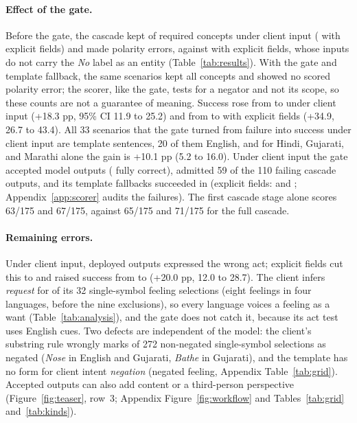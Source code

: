 


\paragraph{Effect of the gate.}
Before the gate, the cascade kept \XPreUKeptPct{} of required concepts under client input (\XPreSKeptPct{} with explicit fields) and made \XPreUPol{} polarity errors, against \XPreSPol{} with explicit fields, whose inputs do not carry the \emph{No} label as an entity (Table~\ref{tab:results}).
With the gate and template fallback, the same scenarios kept all \NConc{} concepts and showed no scored polarity error; the scorer, like the gate, tests for a negator and not its scope, so these counts are not a guarantee of meaning.
Success rose from \XPreUSucc{} to \XDepUSucc{} under client input (+18.3 pp, 95\% CI 11.9 to 25.2) and from \XPreSSucc{} to \XDepSSucc{} with explicit fields (+34.9, 26.7 to 43.4).
All 33 scenarios that the gate turned from failure into success under client input are template sentences, 20 of them English, and for Hindi, Gujarati, and Marathi alone the gain is +10.1 pp (5.2 to 16.0).
Under client input the gate accepted \XGateAccU{} model outputs (\XGateOkU{} fully correct), admitted 59 of the 110 failing cascade outputs, and its template fallbacks succeeded in \XFbOkU{} (explicit fields: \XGateOkS{} and \XFbOkS{}; Appendix~\ref{app:scorer} audits the failures).
The first cascade stage alone scores 63/175 and 67/175, against 65/175 and 71/175 for the full cascade.

\paragraph{Remaining errors.}
Under client input, \XDepUWrong{} deployed outputs expressed the wrong act; explicit fields cut this to \XDepSWrong{} and raised success from \XDepUSuccPct{} to \XDepSSuccPct{} (+20.0 pp, 12.0 to 28.7).
The client infers \emph{request} for \UIFeelReq{} of its 32 single-symbol feeling selections (eight feelings in four languages, before the nine exclusions), so every language voices a feeling as a want (Table~\ref{tab:analysis}), and the gate does not catch it, because its act test uses English cues.
Two defects are independent of the model: the client's substring rule wrongly marks \UIFalseNeg{} of 272 non-negated single-symbol selections as negated (\emph{Nose} in English and Gujarati, \emph{Bathe} in Gujarati), and the template has no form for client intent \emph{negation} (negated feeling, Appendix Table~\ref{tab:grid}).
Accepted outputs can also add content or a third-person perspective (Figure~\ref{fig:teaser}, row~3; Appendix Figure~\ref{fig:workflow} and Tables~\ref{tab:grid} and~\ref{tab:kinds}).

